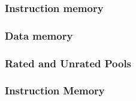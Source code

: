 
\subsubsection{Instruction memory}







\subsubsection{Data memory}



\subsubsection{Rated and Unrated Pools}


\subsubsection{Instruction Memory}
